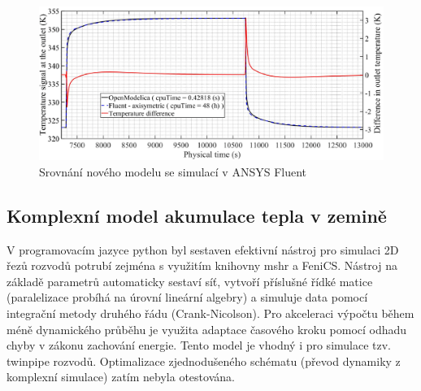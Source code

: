 \begin{figure}[h!]\centering
    \includegraphics[scale=0.7]{figures/pipe_Fluent_OM}
  \caption{Srovnání nového modelu se simulací v ANSYS Fluent}
  \label{fig:OM_vs_Fluent}
\end{figure}
\subsection{Komplexní model akumulace tepla v zemině}
V programovacím jazyce python byl sestaven efektivní nástroj pro simulaci 2D
řezů rozvodů potrubí zejména s využitím knihovny mshr a FeniCS. Nástroj na
základě parametrů automaticky sestaví síť, vytvoří příslušné řídké matice
(paralelizace probíhá na úrovní lineární algebry) a simuluje data pomocí
integrační metody druhého řádu (Crank-Nicolson). Pro akceleraci výpočtu během
méně dynamického průběhu je využita adaptace časového kroku pomocí odhadu
chyby v zákonu zachování energie. Tento model je vhodný i pro simulace tzv.
twinpipe rozvodů. Optimalizace zjednodušeného schématu (převod dynamiky z
komplexní simulace) zatím nebyla otestována.

